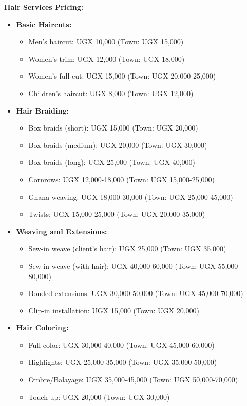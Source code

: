 \documentclass[a4paper,12pt]{article}
\begin{document}
\textbf{Hair Services Pricing:}
\begin{itemize}[leftmargin=2em]
    \item \textbf{Basic Haircuts:}
    \begin{itemize}
        \item Men's haircut: UGX 10,000 (Town: UGX 15,000)
        \item Women's trim: UGX 12,000 (Town: UGX 18,000)
        \item Women's full cut: UGX 15,000 (Town: UGX 20,000-25,000)
        \item Children's haircut: UGX 8,000 (Town: UGX 12,000)
    \end{itemize}
    
    \item \textbf{Hair Braiding:}
    \begin{itemize}
        \item Box braids (short): UGX 15,000 (Town: UGX 20,000)
        \item Box braids (medium): UGX 20,000 (Town: UGX 30,000)
        \item Box braids (long): UGX 25,000 (Town: UGX 40,000)
        \item Cornrows: UGX 12,000-18,000 (Town: UGX 15,000-25,000)
        \item Ghana weaving: UGX 18,000-30,000 (Town: UGX 25,000-45,000)
        \item Twists: UGX 15,000-25,000 (Town: UGX 20,000-35,000)
    \end{itemize}
    
    \item \textbf{Weaving and Extensions:}
    \begin{itemize}
        \item Sew-in weave (client's hair): UGX 25,000 (Town: UGX 35,000)
        \item Sew-in weave (with hair): UGX 40,000-60,000 (Town: UGX 55,000-80,000)
        \item Bonded extensions: UGX 30,000-50,000 (Town: UGX 45,000-70,000)
        \item Clip-in installation: UGX 15,000 (Town: UGX 20,000)
    \end{itemize}
    
    \item \textbf{Hair Coloring:}
    \begin{itemize}
        \item Full color: UGX 30,000-40,000 (Town: UGX 45,000-60,000)
        \item Highlights: UGX 25,000-35,000 (Town: UGX 35,000-50,000)
        \item Ombre/Balayage: UGX 35,000-45,000 (Town: UGX 50,000-70,000)
        \item Touch-up: UGX 20,000 (Town: UGX 30,000)
    \end{itemize}
    

\end{itemize}
\end{document}
